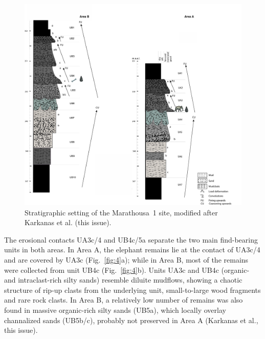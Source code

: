 \documentclass[preprint,authoryear,times]{elsarticle} %
\begin{document}
\begin{figure}[]
  \centering
  \includegraphics[width=1\textwidth]{../artwork/Fig3.pdf}
  \caption{Stratigraphic setting of the Marathousa~1 site, modified after Karkanas et al. (this issue).}
  \label{fig:3}
\end{figure}

The erosional contacts UA3c/4 and UB4c/5a separate the two main find-bearing units in both areas. In Area A, the elephant remains lie at the contact of UA3c/4 and are covered by UA3c (Fig.~\ref{fig:4}a); while in Area B, most of the remains were collected from unit UB4c (Fig.~\ref{fig:4}b). Units UA3c and UB4c (organic- and intraclast-rich silty sands) resemble diluite mudflows, showing a chaotic structure of rip-up clasts from the underlying unit, small-to-large wood fragments and rare rock clasts. In Area B, a relatively low number of remains was also found in massive organic-rich silty sands (UB5a), which locally overlay channalized sands (UB5b/c), probably not preserved in Area A (Karkanas et al., this issue).
\end{document}
